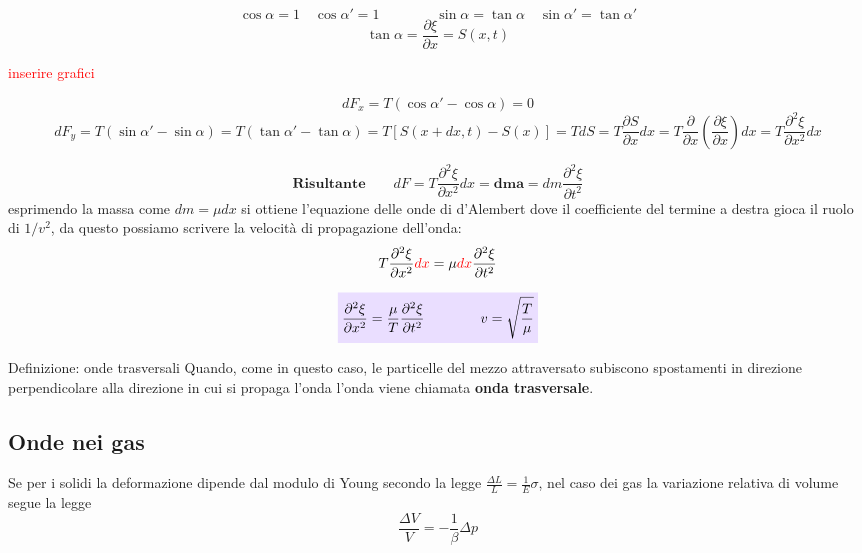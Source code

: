\documentclass[x11names]{article}
\newcommand{\viola}[1]{\colorbox{yred}{$\displaystyle #1$}}
\begin{document}
	\[ 
	\cos{\alpha} = 1 \quad \cos{\alpha'} = 1 \qquad \qquad \sin{\alpha} = \tan{\alpha} \quad \sin{\alpha'} = \tan{\alpha'}
	\]
	\[ 
	\boxed{\tan\alpha = \frac{\partial \xi}{\partial x} = S(x,t)}
	\]
	
	\begin{center}
		\textcolor{red}{inserire grafici}
	\end{center}
	
	
	\[ 
	dF_x = T(\cos\alpha' - \cos\alpha ) = 0 
	\]
	\[ 
	 dF_y = T(\sin\alpha' - \sin\alpha ) = T(\tan\alpha' - \tan\alpha ) = T\left[S(x+dx,t) - S(x)\right] = TdS = T\frac{\partial S}{\partial x}dx = T\frac{\partial}{\partial x}\left(\frac{\partial \xi}{\partial x}\right)dx = T\frac{\partial^2 \xi}{\partial x^2}dx
	\]
	
	\[ 
	\textbf{Risultante} \qquad	dF =  T\frac{\partial^2 \xi}{\partial x^2}dx  \mathbf{= dm a} = dm \frac{\partial^2 \xi}{\partial t^2} 
	\]
	esprimendo la massa come \(dm = \mu dx\) si ottiene l'equazione delle onde di d'Alembert dove il coefficiente del termine a destra gioca il ruolo di \(1/v^2\), da questo possiamo scrivere la velocità di propagazione dell'onda:
	\[ 
	T\frac{\partial^2\xi}{\partial x^2}\textcolor{red}{dx} = \mu \textcolor{red}{dx} \frac{\partial^2 \xi}{\partial t^2}
	\]

	\begin{equation}\label{corda}
		\viola{	\frac{\partial^2\xi}{\partial x^2} = \frac{\mu}{T} \frac{\partial^2 \xi}{\partial t^2} \qquad \qquad v = \sqrt{\frac{T}{\mu}}}
	\end{equation}
	
	\begin{center}
		\colorbox{yblue}{\begin{minipage}{5.75in}
				\begin{blues}{Definizione: onde trasversali}
					Quando, come in questo caso, le particelle del mezzo attraversato subiscono spostamenti in direzione perpendicolare alla direzione in cui si propaga l'onda l'onda viene chiamata \textbf{onda trasversale}.
				\end{blues}
		\end{minipage}}
	\end{center}
	
\newpage
\subsection{Onde nei gas}
	Se per i solidi la deformazione dipende dal modulo di Young secondo la legge \(\frac{\Delta L}{L} = \frac{1}{E}\sigma\), nel caso dei gas la variazione relativa di volume segue la legge
	\[ 
	\frac{\Delta V}{V} = -\frac{1}{\beta} \Delta p
	\] \\
	
\end{document}
